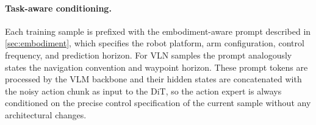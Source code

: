 \paragraph{Task-aware conditioning.}
Each training sample is prefixed with the embodiment-aware prompt described in \cref{sec:embodiment}, which specifies the robot platform, arm configuration, control frequency, and prediction horizon.
For VLN samples the prompt analogously states the navigation convention and waypoint horizon.
These prompt tokens are processed by the VLM backbone and their hidden states are concatenated with the noisy action chunk as input to the DiT, so the action expert is always conditioned on the precise control specification of the current sample without any architectural changes.

